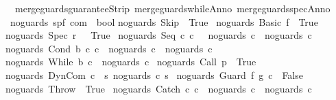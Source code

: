 \begin{isabellebody}
\ \ merge{\isacharunderscore}guards{\isacharunderscore}guaranteeStrip\ merge{\isacharunderscore}guards{\isacharunderscore}whileAnno\ merge{\isacharunderscore}guards{\isacharunderscore}specAnno\isanewline
\isanewline
{}\isamarkupfalse%
\ noguards{\isacharcolon}{\isacharcolon}\ {\isachardoublequoteopen}{\isacharparenleft}{\isacharprime}s{\isacharcomma}{\isacharprime}p{\isacharcomma}{\isacharprime}f{\isacharparenright}\ com\ {\isasymRightarrow}\ bool{\isachardoublequoteclose}\isanewline
{}\isanewline
{\isachardoublequoteopen}noguards\ Skip\ {\isacharequal}\ True{\isachardoublequoteclose}\ {\isacharbar}\isanewline
{\isachardoublequoteopen}noguards\ {\isacharparenleft}Basic\ f{\isacharparenright}\ {\isacharequal}\ True{\isachardoublequoteclose}\ {\isacharbar}\isanewline
{\isachardoublequoteopen}noguards\ {\isacharparenleft}Spec\ r\ {\isacharparenright}\ {\isacharequal}\ True{\isachardoublequoteclose}\ {\isacharbar}\isanewline
{\isachardoublequoteopen}noguards\ {\isacharparenleft}Seq\ c\ c\ \ {\isacharequal}\ {\isacharparenleft}noguards\ c\ {\isasymand}\ noguards\ c\ {\isacharbar}\isanewline
{\isachardoublequoteopen}noguards\ {\isacharparenleft}Cond\ b\ c\ c\ {\isacharequal}\ {\isacharparenleft}noguards\ c\ {\isasymand}\ noguards\ c\ {\isacharbar}\isanewline
{\isachardoublequoteopen}noguards\ {\isacharparenleft}While\ b\ c{\isacharparenright}\ {\isacharequal}\ {\isacharparenleft}noguards\ c{\isacharparenright}{\isachardoublequoteclose}\ {\isacharbar}\isanewline
{\isachardoublequoteopen}noguards\ {\isacharparenleft}Call\ p{\isacharparenright}\ {\isacharequal}\ True{\isachardoublequoteclose}\ {\isacharbar}\isanewline
{\isachardoublequoteopen}noguards\ {\isacharparenleft}DynCom\ c{\isacharparenright}\ {\isacharequal}\ {\isacharparenleft}{\isasymforall}s{\isachardot}\ noguards\ {\isacharparenleft}c\ s{\isacharparenright}{\isacharparenright}{\isachardoublequoteclose}\ {\isacharbar}\isanewline
{\isachardoublequoteopen}noguards\ {\isacharparenleft}Guard\ f\ g\ c{\isacharparenright}\ {\isacharequal}\ False{\isachardoublequoteclose}\ {\isacharbar}\isanewline
{\isachardoublequoteopen}noguards\ Throw\ {\isacharequal}\ True{\isachardoublequoteclose}\ {\isacharbar}\isanewline
{\isachardoublequoteopen}noguards\ {\isacharparenleft}Catch\ c\ c\ {\isacharequal}\ {\isacharparenleft}noguards\ c\ {\isasymand}\ noguards\ c\isanewline

\end{isabellebody}
